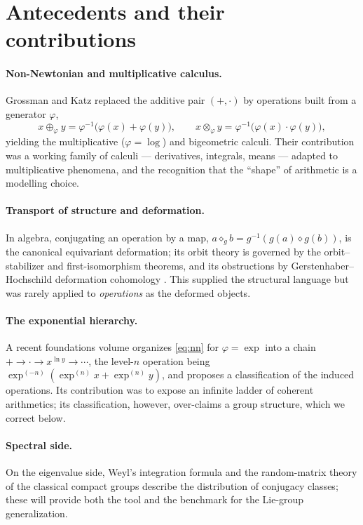 \documentclass[11pt,a4paper]{article}
\theoremstyle{plain}
\theoremstyle{definition}
\theoremstyle{remark}
\begin{document}
\section{Antecedents and their contributions}
\label{sec:prior}

\paragraph{Non-Newtonian and multiplicative calculus.}
Grossman and Katz \cite{grossman} replaced the additive pair $(+,\cdot)$ by
operations built from a generator $\varphi$,
\begin{equation}\label{eq:nn}
x\oplus_\varphi y=\varphi^{-1}\bigl(\varphi(x)+\varphi(y)\bigr),\qquad
x\otimes_\varphi y=\varphi^{-1}\bigl(\varphi(x)\cdot\varphi(y)\bigr),
\end{equation}
yielding the multiplicative ($\varphi=\log$) and bigeometric calculi. Their
contribution was a working family of calculi --- derivatives, integrals, means
--- adapted to multiplicative phenomena, and the recognition that the ``shape''
of arithmetic is a modelling choice.

\paragraph{Transport of structure and deformation.}
In algebra, conjugating an operation by a map, $a\diamond_g b=g^{-1}(g(a)\diamond
g(b))$, is the canonical equivariant deformation; its orbit theory is governed
by the orbit--stabilizer and first-isomorphism theorems, and its obstructions by
Gerstenhaber--Hochschild deformation cohomology \cite{gerstenhaber}. This
supplied the structural language but was rarely applied to \emph{operations} as
the deformed objects.

\paragraph{The exponential hierarchy.}
A recent foundations volume organizes \eqref{eq:nn} for $\varphi=\exp$ into a
chain $+\to\cdot\to x^{\ln y}\to\cdots$, the level-$n$ operation being
$\exp^{(-n)}(\exp^{(n)}x+\exp^{(n)}y)$, and proposes a classification of the
induced operations. Its contribution was to expose an infinite ladder of
coherent arithmetics; its classification, however, over-claims a group
structure, which we correct below.

\paragraph{Spectral side.}
On the eigenvalue side, Weyl's integration formula and the random-matrix theory
of the classical compact groups \cite{weyl,mehta,mezzadri} describe the
distribution of conjugacy classes; these will provide both the tool and the
benchmark for the Lie-group generalization.
\end{document}
